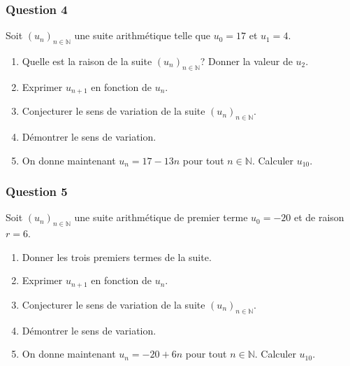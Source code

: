 \documentclass[15pt, mathserif]{beamer}
\newcommand{\N}{\mathbb{N}}			%
\newcommand{\st}[1]{$(#1_n)_{n \in \N}$}
\begin{document}
\begin{frame} 
	\frametitle{Question 4}
Soit \st{u} une suite arithmétique telle que $u_0=17$ et $u_1=4$. 
 
 \begin{enumerate} 
 	 \item Quelle est la raison de la suite \st{u}? Donner la valeur de $u_2$. 
 	 \item Exprimer $u_{n+1}$ en fonction de $u_n$. 
 	 \item Conjecturer le sens de variation de la suite \st{u}. 
 	 \item Démontrer le sens de variation. 
 	 \item On donne maintenant $u_n=17-13n$ pour tout $n \in \N$. Calculer $u_{10}$. 
 
 \end{enumerate} \end{frame}


\begin{frame} 
	\frametitle{Question 5}
Soit \st{u} une suite arithmétique de premier terme $u_0=-20$ et de raison $r=6$. 
 
 \begin{enumerate} 
 	 \item Donner les trois premiers termes de la suite. 
 	 \item Exprimer $u_{n+1}$ en fonction de $u_n$. 
 	 \item Conjecturer le sens de variation de la suite \st{u}. 
 	 \item Démontrer le sens de variation. 
 	 \item On donne maintenant $u_n=-20+6n$ pour tout $n \in \N$. Calculer $u_{10}$. 
 
 \end{enumerate} \end{frame}
\end{document}
